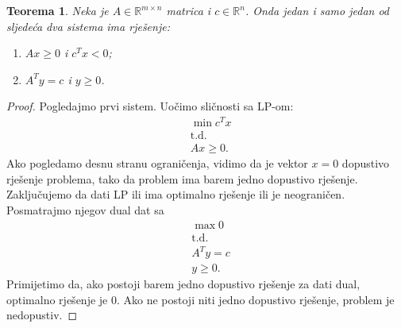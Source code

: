 \documentclass[a4paper, utf8, 11pt, colorlinks]{book}
\newtheorem{thm}{Teorema}[chapter]
\theoremstyle{definition}
\begin{document}
\begin{thm}
	Neka je $A\in \mathbb{R}^{m \times n}$ matrica i $c\in \mathbb{R}^n$. Onda jedan i samo jedan od  sljedeća dva sistema ima rješenje:
	\begin{enumerate}
		\item  $Ax \geq 0$  i $c^T x < 0$; \label{case:1}
		\item $A^T y = c$ i $y \geq 0$. \label{case:2}
	\end{enumerate}
\end{thm}
\begin{proof}
	  Pogledajmo prvi sistem. Uočimo sličnosti sa   LP-om:
	  \begin{align*}
	  	 &\min c^T x \\
	  	 &\mbox{t.d.} \\
	  	 & A x \geq 0.
	  \end{align*}
 Ako pogledamo desnu stranu ograničenja, vidimo da je vektor $x = 0$ 
  dopustivo rješenje problema, tako da problem ima barem jedno dopustivo rješenje. Zaključujemo da dati LP  ili ima optimalno rješenje ili je neograničen. Posmatrajmo njegov dual   dat sa 
  \begin{align*}
  	   &\max 0 \\
  	   &\mbox{t.d.} \\
  	   & A^T y  = c \\
  	   & y \geq 0.
  \end{align*}
  Primijetimo da, ako postoji barem jedno dopustivo rješenje za dati dual, optimalno rješenje je 0. Ako ne postoji niti jedno dopustivo rješenje, problem je nedopustiv. 
  

\end{proof}
\end{document}

